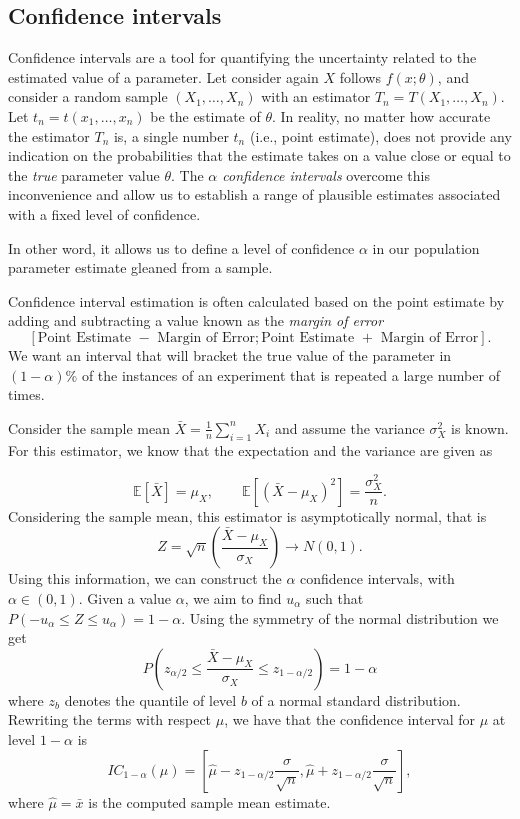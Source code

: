 \documentclass[
]{article}
\begin{document}
\hypertarget{confidence-intervals}{%
\subsection{Confidence intervals}\label{confidence-intervals}}

Confidence intervals are a tool for quantifying the uncertainty related
to the estimated value of a parameter. Let consider again \(X\) follows
\(f(x;\theta)\), and consider a random sample \((X_1,\ldots,X_n)\) with
an estimator \(T_n=T(X_1,\ldots,X_n)\). Let \(t_n=t(x_1,\ldots,x_n)\) be
the estimate of \(\theta\). In reality, no matter how accurate the
estimator \(T_n\) is, a single number \(t_n\) (i.e., point estimate),
does not provide any indication on the probabilities that the estimate
takes on a value close or equal to the \emph{true} parameter value
\(\theta\). The \emph{\(\alpha\) confidence intervals} overcome this
inconvenience and allow us to establish a range of plausible estimates
associated with a fixed level of confidence.

In other word, it allows us to define a level of confidence \(\alpha\)
in our population parameter estimate gleaned from a sample.

Confidence interval estimation is often calculated based on the point
estimate by adding and subtracting a value known as the \emph{margin of
error}
\[ [\mbox{Point Estimate } - \mbox{ Margin of Error}; \mbox{Point Estimate } + \mbox{ Margin of Error}].\]
We want an interval that will bracket the true value of the parameter in
\((1-\alpha)\)\% of the instances of an experiment that is repeated a
large number of times.

Consider the sample mean \(\bar{X} = \frac{1}{n}\sum_{i=1}^n X_i\) and
assume the variance \(\sigma_X^2\) is known. For this estimator, we know
that the expectation and the variance are given as

\[
\mathbb{E}[\bar{X}] = \mu_X, \qquad \mathbb{E}[(\bar{X} - \mu_X)^2] = \frac{\sigma_X^2}{n}.
\] Considering the sample mean, this estimator is asymptotically normal,
that is \[
Z = \sqrt{n}\left(\frac{\bar{X} - \mu_X}{\sigma_X}\right) \rightarrow N(0,1).
\] Using this information, we can construct the \(\alpha\) confidence
intervals, with \(\alpha \in (0,1)\). Given a value \(\alpha\), we aim
to find \(u_{\alpha}\) such that
\(P(-u_{\alpha} \leq Z \leq u_{\alpha}) = 1 - \alpha\). Using the
symmetry of the normal distribution we get
\[ P\left(z_{\alpha/2} \leq \frac{\bar{X} - \mu_X}{\sigma_X} \leq z_{1-\alpha/2}\right) = 1 - \alpha\]
where \(z_b\) denotes the quantile of level \(b\) of a normal standard
distribution. Rewriting the terms with respect \(\mu\), we have that the
confidence interval for \(\mu\) at level \(1-\alpha\) is
\[IC_{1-\alpha}(\mu) = \left[ \hat{\mu} - z_{1-\alpha/2}\frac{\sigma}{\sqrt{n}}, \hat{\mu} + z_{1-\alpha/2}\frac{\sigma}{\sqrt{n}} \right],\]
where \(\hat{\mu} = \bar{x}\) is the computed sample mean estimate.
\end{document}
